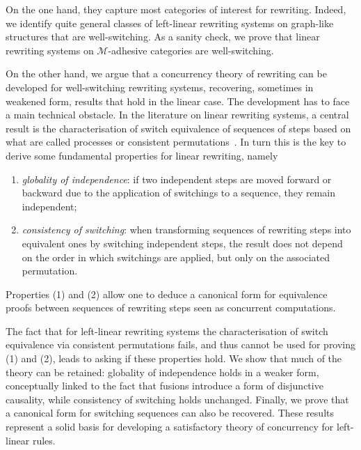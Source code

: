 \documentclass[a4paper,UKenglish,cleveref,pdftex,thm-restate,numberwithinsect]{lipics-v2021}
\begin{document}
On the one hand, they capture most categories of
interest for rewriting. Indeed, we identify quite general classes of
left-linear rewriting systems on graph-like structures that are
well-switching.
As a sanity check, we prove that linear rewriting systems on
$\mathcal{M}$-adhesive categories are well-switching.

On the other hand, we argue that a concurrency theory of rewriting can
be developed for well-switching rewriting systems, recovering, sometimes in
weakened form, results that hold in the linear case.
%
The development has to face a main technical obstacle. In the
literature on linear rewriting systems, a central result is the
characterisation of switch equivalence of sequences of steps based on
what are called processes or consistent
permutations~\cite{CMR:GP,Handbook,BaldanCHKS06,heindel2009category}.
In turn this is the key to derive some
fundamental
properties for linear rewriting,
namely
\begin{enumerate}
\item \emph{globality of independence}: if two independent steps are
  moved forward or backward due to the application of switchings to a
  sequence, they remain independent;
\item \emph{consistency of switching}: when transforming
  sequences of rewriting steps into equivalent ones by switching independent steps, the
  result does not depend on the order in which switchings are applied, but
  only on the associated permutation.
\end{enumerate}
Properties (1) and (2) allow one to deduce a canonical form for equivalence proofs 
between sequences of rewriting steps seen as concurrent computations.

The fact that for left-linear rewriting systems the characterisation
of switch equivalence via consistent permutations fails, and thus
cannot be used for proving (1) and (2), leads to asking if these
properties hold.  We show that much of the theory can be
retained: globality of independence holds in a weaker form,
conceptually linked to the fact that fusions introduce a form of
disjunctive causality, while consistency of switching holds
unchanged. Finally, we prove that a canonical form for switching
sequences can also be recovered. These results represent a solid basis for
developing a satisfactory theory of concurrency for left-linear
rules.
\end{document}
